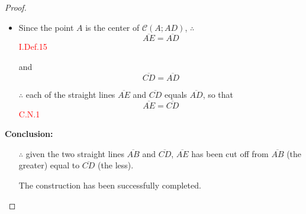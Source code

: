 \begin{proof}

\begin{itemize}
\item[]
\item Since the point $A$ is the center of $\mathscr{C}(A;AD)$, $\therefore$\[ \overline{AE} = \overline{AD}\]\hfill\textcolor{red}{I.Def.15}
  
  
\item[and]
\[\overline{CD} = \overline{AD}\]

\item[$\therefore$] each of the straight lines $\overline{AE}$ and $\overline{CD}$ equals $\overline{AD}$, so that
 \[\overline{AE} = \overline{CD}\] \hfill\textcolor{red}{C.N.1}
\end{itemize}

\textbf{Conclusion:}
\begin{itemize}
\item[$\therefore$] given the two straight lines $\overline{AB}$ and $\overline{CD}$, $\overline{AE}$ has been cut off from $\overline{AB}$ (the greater) equal to $\overline{CD}$ (the less).

\item[] The construction has been successfully completed. 
\end{itemize}

\end{proof}

\clearpage